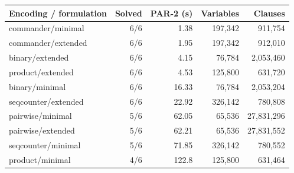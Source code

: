 \begin{tabular}{lrrrr}
\toprule
Encoding / formulation & Solved & PAR-2 (s) & Variables & Clauses \\
\midrule
commander/minimal & 6/6 & 1.38 & 197,342 & 911,754 \\
commander/extended & 6/6 & 1.95 & 197,342 & 912,010 \\
binary/extended & 6/6 & 4.15 & 76,784 & 2,053,460 \\
product/extended & 6/6 & 4.53 & 125,800 & 631,720 \\
binary/minimal & 6/6 & 16.33 & 76,784 & 2,053,204 \\
seqcounter/extended & 6/6 & 22.92 & 326,142 & 780,808 \\
pairwise/minimal & 5/6 & 62.05 & 65,536 & 27,831,296 \\
pairwise/extended & 5/6 & 62.21 & 65,536 & 27,831,552 \\
seqcounter/minimal & 5/6 & 71.85 & 326,142 & 780,552 \\
product/minimal & 4/6 & 122.8 & 125,800 & 631,464 \\
\bottomrule
\end{tabular}
